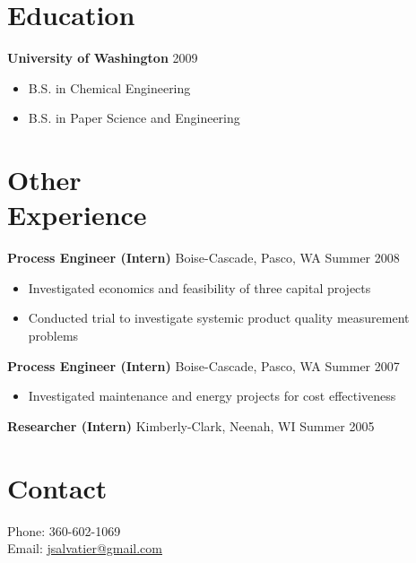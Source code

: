 \documentclass[margin]{res}
\newcommand{\bitem}{\begin{samepage}\begin{itemize} \itemsep -2pt}
\newcommand{\eitem}{\end{itemize}\end{samepage} }
\newcommand{\hrowbase}[3]{
  {\bf #1} #2 \hfill #3
}
\newcommand{\headrow}[3]{
  \hrowbase{#1}{#2}{#3}
    \vspace{6pt}
    \bitem
      }
\newcommand{\eheadrow}[0]{\eitem}
\newcommand{\email}[1]{ \href{mailto:#1}{#1}}
\begin{document}
\begin{resume}
\section{Education} 
  \headrow{University of Washington}{}{2009}
      \item B.S. in Chemical Engineering
      \item B.S. in Paper Science and Engineering
  \eheadrow
    
\section{Other \\ Experience}
    \headrow{Process Engineer (Intern)}{Boise-Cascade, Pasco, WA}{Summer 2008}
      \item Investigated economics and feasibility of three capital projects 
      \item Conducted trial to investigate systemic product quality measurement problems 
    \eheadrow

    \headrow{Process Engineer (Intern)}{Boise-Cascade, Pasco, WA}{Summer 2007}
      \item Investigated maintenance and energy projects for cost effectiveness 
    \eheadrow

    \hrowbase{Researcher (Intern)}{Kimberly-Clark, Neenah, WI}{Summer 2005 }

\section{Contact}
     Phone: 360-602-1069 \\
     Email: \email{jsalvatier@gmail.com}


\end{resume} 
\end{document}
